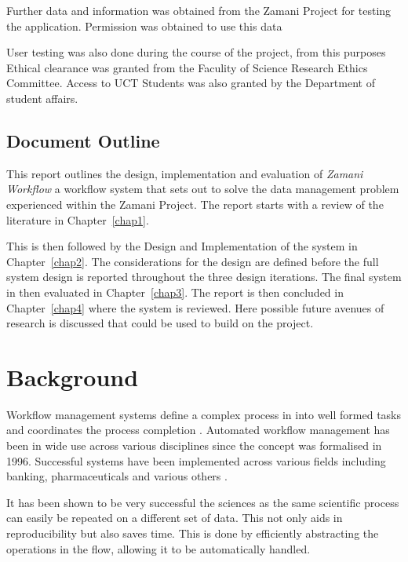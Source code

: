 \documentclass[12pt,a4paper]{report}
\begin{document}
    Further data and information was obtained from the Zamani Project for
    testing the application. Permission was obtained to use this data

    User testing was also done during the course of the project, from
    this purposes Ethical clearance was granted from the Faculity of
    Science Research Ethics Committee. Access to UCT Students was also
    granted by the Department of student affairs.

\section{Document Outline}
    This report outlines the design, implementation and evaluation
    of \emph{Zamani Workflow} a workflow system that sets out to
    solve the data management problem experienced within the
    Zamani Project. The report starts with a review of the literature in
    Chapter~\ref{chap1}.

    This is then followed by the Design and Implementation of the system
    in Chapter~\ref{chap2}. The considerations for the design are defined
    before the full system design is reported throughout the three design
    iterations.  The final system in then evaluated in Chapter~\ref{chap3}.
    The report is then concluded in Chapter~\ref{chap4} where the system is 
    reviewed. Here possible future avenues of research is discussed that could
    be used to build on the project.

\chapter{Background\label{chap1}}
    Workflow management systems define a complex process in into well formed
    tasks and coordinates the process completion \cite{1245778}.  Automated
    workflow management has been in wide use across various disciplines since
    the concept was formalised in 1996\cite{springerlink:10.1007/BF00136712}.
    Successful systems have been implemented across various fields including
    banking, pharmaceuticals and various others
    \cite{Brahe:2007:SWW:1316624.1316661,5407993}.

    It has been shown to be very successful the sciences as the same scientific
    process can easily be repeated on a different set of data\cite{4721191}.
    This not only aids in reproducibility but also saves time.  This is done by
    efficiently abstracting the operations in the flow, allowing it to be
    automatically handled.
\end{document}
